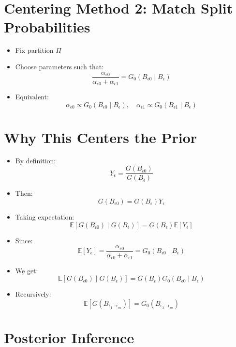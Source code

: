 \documentclass[12pt,oneside]{book}
\numberwithin{equation}{section}
\theoremstyle{definition}
\theoremstyle{plain}
\theoremstyle{remark}
\begin{document}
\section{Centering Method 2: Match Split Probabilities}

\begin{itemize}
\item Fix partition $\Pi$

\item Choose parameters such that:
\[
\frac{\alpha_{\epsilon 0}}{\alpha_{\epsilon 0} + \alpha_{\epsilon 1}}
=
G_0(B_{\epsilon 0} \mid B_\epsilon)
\]

\item Equivalent:
\[
\alpha_{\epsilon 0} \propto G_0(B_{\epsilon 0} \mid B_\epsilon), \quad
\alpha_{\epsilon 1} \propto G_0(B_{\epsilon 1} \mid B_\epsilon)
\]
\end{itemize}

\section{Why This Centers the Prior}

\begin{itemize}
\item By definition:
\[
Y_\epsilon = \frac{G(B_{\epsilon 0})}{G(B_\epsilon)}
\]

\item Then:
\[
G(B_{\epsilon 0}) = G(B_\epsilon) Y_\epsilon
\]

\item Taking expectation:
\[
\mathbb{E}[G(B_{\epsilon 0}) \mid G(B_\epsilon)]
= G(B_\epsilon) \mathbb{E}[Y_\epsilon]
\]

\item Since:
\[
\mathbb{E}[Y_\epsilon] = \frac{\alpha_{\epsilon 0}}{\alpha_{\epsilon 0} + \alpha_{\epsilon 1}}
= G_0(B_{\epsilon 0} \mid B_\epsilon)
\]

\item We get:
\[
\mathbb{E}[G(B_{\epsilon 0}) \mid G(B_\epsilon)]
= G(B_\epsilon) G_0(B_{\epsilon 0} \mid B_\epsilon)
\]

\item Recursively:
\[
\mathbb{E}[G(B_{\epsilon_1 \cdots \epsilon_m})]
= G_0(B_{\epsilon_1 \cdots \epsilon_m})
\]
\end{itemize}

\section{Posterior Inference}
\end{document}
